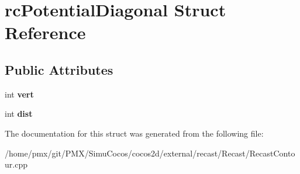 \hypertarget{structrcPotentialDiagonal}{}\section{rc\+Potential\+Diagonal Struct Reference}
\label{structrcPotentialDiagonal}
\subsection*{Public Attributes}
\begin{DoxyCompactItemize}
\item 
\mbox{\label{structrcPotentialDiagonal_aa0ab356474c301630105b9c4125bb0e3}} 
int {\bfseries vert}
\item 
\mbox{\label{structrcPotentialDiagonal_aedf8e9dad665440c8db85e1e9d37b05d}} 
int {\bfseries dist}
\end{DoxyCompactItemize}


The documentation for this struct was generated from the following file\+:\begin{DoxyCompactItemize}
\item 
/home/pmx/git/\+P\+M\+X/\+Simu\+Cocos/cocos2d/external/recast/\+Recast/Recast\+Contour.\+cpp\end{DoxyCompactItemize}

